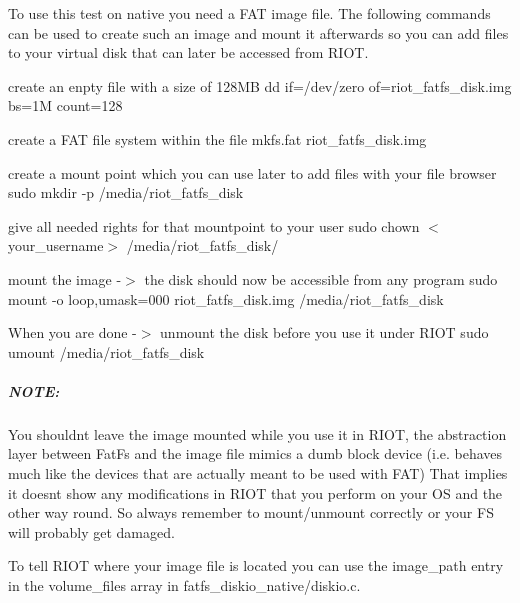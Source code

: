 To use this test on native you need a F\+AT image file. The following commands can be used to create such an image and mount it afterwards so you can add files to your virtual disk that can later be accessed from R\+I\+OT.


\begin{DoxyEnumerate}
\item create an enpty file with a size of 128\+MB {\ttfamily dd if=/dev/zero of=riot\+\_\+fatfs\+\_\+disk.\+img bs=1M count=128}
\item create a F\+AT file system within the file {\ttfamily mkfs.\+fat riot\+\_\+fatfs\+\_\+disk.\+img}
\item create a mount point which you can use later to add files with your file browser {\ttfamily sudo mkdir -\/p /media/riot\+\_\+fatfs\+\_\+disk}
\item give all needed rights for that mountpoint to your user {\ttfamily sudo chown $<$your\+\_\+username$>$ /media/riot\+\_\+fatfs\+\_\+disk/}
\item mount the image -\/$>$ the disk should now be accessible from any program {\ttfamily sudo mount -\/o loop,umask=000 riot\+\_\+fatfs\+\_\+disk.\+img /media/riot\+\_\+fatfs\+\_\+disk}
\item When you are done -\/$>$ unmount the disk before you use it under R\+I\+OT {\ttfamily sudo umount /media/riot\+\_\+fatfs\+\_\+disk}
\end{DoxyEnumerate}

\subparagraph*{N\+O\+TE\+:}

You shouldn\textquotesingle{}t leave the image mounted while you use it in R\+I\+OT, the abstraction layer between Fat\+Fs and the image file mimics a dumb block device (i.\+e. behaves much like the devices that are actually meant to be used with F\+AT) That implies it doesn\textquotesingle{}t show any modifications in R\+I\+OT that you perform on your OS and the other way round. So always remember to mount/unmount correctly or your FS will probably get damaged.

To tell R\+I\+OT where your image file is located you can use the image\+\_\+path entry in the volume\+\_\+files array in fatfs\+\_\+diskio\+\_\+native/diskio.\+c. 